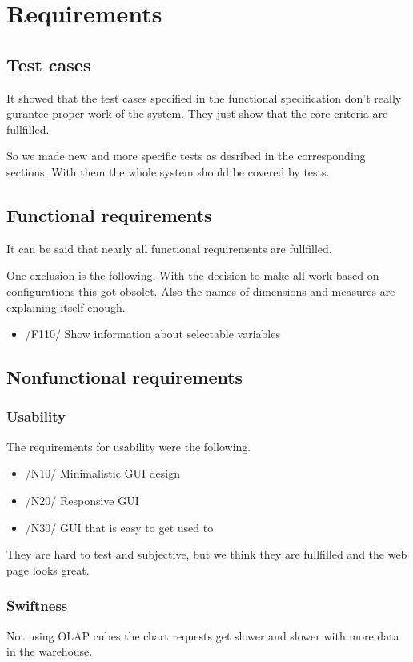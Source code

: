 \section{Requirements}\label{spec}


\subsection{Test cases}
It showed that the test cases specified in the functional specification
don't really gurantee proper work of the system. They just show
that the core criteria are fullfilled. 

So we made new and more specific tests as desribed in the
corresponding sections. With them the whole system should be covered by tests.

\subsection{Functional requirements}
It can be said that nearly all functional requirements are fullfilled.

One exclusion is the following. With the decision to make all work 
based on configurations this got obsolet. Also the names of dimensions
and measures are explaining itself enough.
\begin{itemize}
  \item /F110/ Show information about selectable variables
\end{itemize}

\subsection{Nonfunctional requirements}
\subsubsection{Usability}
The requirements for usability were the following. 
\begin{itemize}
  \item /N10/ Minimalistic GUI design
  \item /N20/ Responsive GUI
  \item /N30/ GUI that is easy to get used to
\end{itemize}
They are hard to test and subjective, but we think they are fullfilled
and the web page looks great.


\subsubsection{Swiftness}
Not using OLAP cubes the chart requests get slower and slower
with more data in the warehouse.

